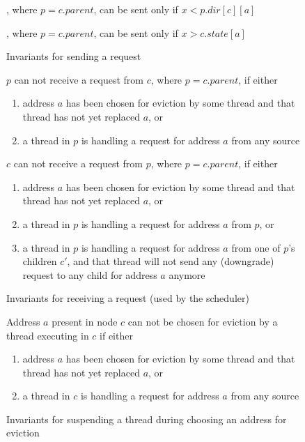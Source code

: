 \begin{figure}\small
\begin{inv}
, where $p = c.parent$, can be sent only if $x < p.dir[c][a]$
\label{pSendReqPre}
\end{inv}
\begin{inv}
, where $p = c.parent$, can be sent only if $x > c.state[a]$
\label{cSendReqPre}
\end{inv}
\caption{Invariants for sending a request}
\label{sendReq}
\end{figure}

\begin{figure}\small
\begin{inv}
$p$ can not receive a request  from $c$, where $p = c.parent$,
if either
\begin{enumerate}
\item address $a$ has been chosen for eviction by some thread and that thread
has not yet replaced $a$, or
\item a thread in $p$ is handling a request for address
$a$ from any source
\end{enumerate}
\label{pHandleReq}
\end{inv}
\begin{inv}
$c$ can not receive a request  from $p$, where $p = c.parent$,
if either
\begin{enumerate}
\item address $a$ has been chosen for eviction by some thread and that thread
has not yet replaced $a$, or
\item a thread in $p$ is handling a request for address
$a$ from $p$, or
\item a thread in $p$ is handling a request for address
$a$ from one of $p$'s children $c'$, and that thread will not send any
(downgrade) request to any child for address $a$ anymore
\end{enumerate}
\label{cHandleReq}
\end{inv}
\caption{Invariants for receiving a request (used by the scheduler)}
\label{recvReq}
\end{figure}

\begin{figure}\small
\begin{inv}
Address $a$ present in node $c$ can not be chosen for eviction by a thread
executing in $c$ if either
\begin{enumerate}
\item address $a$ has been chosen for eviction by some thread and that thread
has not yet replaced $a$, or
\item a thread in $c$ is handling a request for address
$a$ from any source
\end{enumerate}
\label{evict}
\caption{Invariants for suspending a thread during choosing an address for eviction}
\end{inv}
\end{figure}

